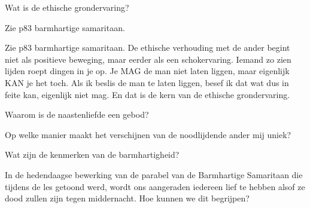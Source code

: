 \documentclass[main.tex]{subfiles}
\begin{document}
\begin{examenvraag}
    \begin{vraag}
        Wat is de ethische grondervaring?
    \end{vraag}
        Zie p83 barmhartige samaritaan.

    \begin{antwoord}
        Zie p83 barmhartige samaritaan.
        De ethische verhouding met de ander begint niet als positieve beweging, maar eerder als een schokervaring. 
        Iemand zo zien lijden roept dingen in je op.
        Je MAG de man niet laten liggen, maar eigenlijk KAN je het toch.
        Als ik beslis de man te laten liggen, besef ik dat wat dus in feite kan, eigenlijk niet mag. 
        En dat is de kern van de ethische grondervaring.
    \end{antwoord}
\end{examenvraag}


\begin{examenvraag}
    \begin{vraag}
        Waarom is de naastenliefde een gebod?
    \end{vraag}

    \begin{antwoord}
    \end{antwoord}
\end{examenvraag}


\begin{examenvraag}
    \begin{vraag}
        Op welke manier maakt het verschijnen van de noodlijdende ander mij uniek?
    \end{vraag}

    \begin{antwoord}
    \end{antwoord}
\end{examenvraag}


\begin{examenvraag}
    \begin{vraag}
        Wat zijn de kenmerken van de barmhartigheid?
    \end{vraag}

    \begin{antwoord}
    \end{antwoord}
\end{examenvraag}


\begin{examenvraag}
    \begin{vraag}
        In de hedendaagse bewerking van de parabel van de Barmhartige Samaritaan die tijdens de les getoond werd, wordt ons aangeraden iedereen lief te hebben alsof ze dood zullen zijn tegen middernacht. Hoe kunnen we dit begrijpen?
    \end{vraag}

    \begin{antwoord}
    \end{antwoord}
\end{examenvraag}
\end{document}
